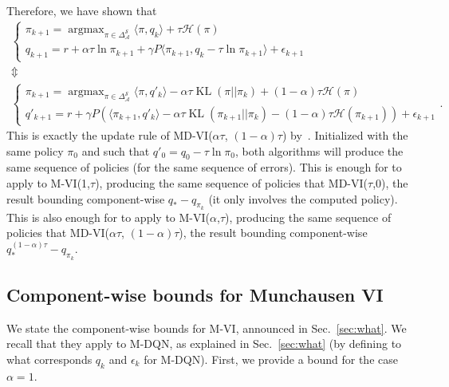 \documentclass{article}
\newcommand{\h}{\mathcal{H}}
\DeclareMathOperator*{\argmax}{argmax}
\DeclareMathOperator{\kl}{KL}
\newcommand{\states}{\mathcal{S}}
\newcommand{\actions}{\mathcal{A}}
\begin{document}
Therefore, we have shown that
\begin{gather}
    \begin{cases}
        \pi_{k+1} = \argmax_{\pi\in\Delta_\actions^\states}\langle\pi, q_k\rangle + \tau\mathcal{H}(\pi)
        \\
        q_{k+1} = r + \alpha\tau\ln\pi_{k+1} + \gamma P\langle\pi_{k+1}, q_k - \tau \ln \pi_{k+1}\rangle  +  \epsilon_{k+1}
    \end{cases}
    \\ \Updownarrow \\
    \begin{cases}
        \pi_{k+1} = \argmax_{\pi\in\Delta_\actions^\states}\langle \pi, q'_k \rangle - \alpha \tau \kl(\pi||\pi_k) + (1-\alpha)\tau \h(\pi)
        \\
        q'_{k+1} = r  + \gamma P\left(\langle\pi_{k+1}, q'_k\rangle  - \alpha \tau \kl(\pi_{k+1}||\pi_k) - (1-\alpha) \tau \h(\pi_{k+1}) \right)  +  \epsilon_{k+1}
    \end{cases}.
\end{gather}
This is exactly the update rule of  MD-VI($\alpha\tau$, $(1-\alpha)\tau$) by~\citet{vieillard2020leverage}. Initialized with the same policy $\pi_0$ and such that $q'_0 = q_0 - \tau \ln \pi_0$, both algorithms will produce the same sequence of policies (for the same sequence of errors). This is enough for \cite[Thm.~1]{vieillard2020leverage} to apply to M-VI(1,$\tau$), producing the same sequence of policies that MD-VI($\tau$,0), the result bounding component-wise $q_* - q_{\pi_k}$ (it only involves the computed policy). This is also enough for \cite[Thm.~2]{vieillard2020leverage} to apply to M-VI($\alpha$,$\tau$), producing the same sequence of policies that MD-VI($\alpha\tau$, $(1-\alpha)\tau$), the result bounding component-wise $q_*^{(1-\alpha)\tau} - q_{\pi_k}$.


\subsection{Component-wise bounds for Munchausen VI}
\label{subappx:bounds}

We state the component-wise bounds for M-VI, announced in Sec.~\ref{sec:what}. We recall that they apply to M-DQN, as explained in Sec.~\ref{sec:what} (by defining to what corresponds $q_k$ and $\epsilon_k$ for M-DQN). 
First, we provide a bound for the case $\alpha=1$.
\end{document}
